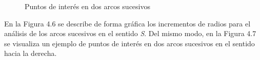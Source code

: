 \begin{figure}[htbp]
\centering
{}
\caption{Puntos de interés en dos arcos sucesivos} \label{fig:señales}
\end{figure}

En la Figura 4.6 se describe de forma gráfica los incrementos de radios para el análisis de los arcos sucesivos en el sentido \textit{S}. Del mismo modo, en la Figura 4.7 se visualiza un ejemplo de puntos de interés en dos arcos sucesivos en el sentido hacia la derecha. \\  





